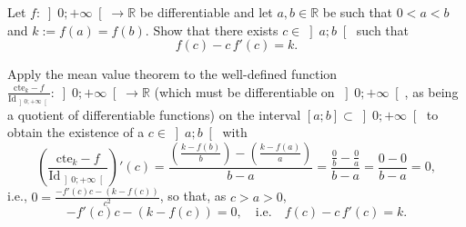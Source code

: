 \begin{problem}
    Let \( f \colon \left]0;+\infty\right[ \longrightarrow \mathbb{R} \) be differentiable and let \( a, b \in \mathbb{R} \) be such that \( 0 < a < b \) and \( k := f\left(a\right) = f\left(b\right) \). Show that there exists \( c \in \left]a;b\right[ \) such that
    \[
        f\left(c\right)-c\,f'\left(c\right) = k.
    \]
\end{problem}
\begin{solution}
    Apply the mean value theorem to the well-defined function \( \frac{\mathrm{cte}_k-f}{\mathrm{Id}_{\left]0;+\infty\right[}} \colon \left]0;+\infty\right[ \longrightarrow \mathbb{R} \) (which must be differentiable on \( \left]0;+\infty\right[ \), as being a quotient of differentiable functions) on the interval \( \left[a;b\right] \subset \left]0;+\infty\right[ \) to obtain the existence of a \( c \in \left]a;b\right[ \) with
    \[
        \left(\frac{\mathrm{cte}_k-f}{\mathrm{Id}_{\left]0;+\infty\right[}}\right)'\left(c\right) = \frac{\left(\frac{k-f\left(b\right)}{b}\right)-\left(\frac{k-f\left(a\right)}{a}\right)}{b-a} = \frac{\frac{0}{b}-\frac{0}{a}}{b-a} = \frac{0-0}{b-a} = 0,
    \]
    i.e., \( 0 = \frac{-f'\left(c\right)c-\left(k-f\left(c\right)\right)}{c^2} \), so that, as \( c > a > 0 \),
    \[
        -f'\left(c\right)c-\left(k-f\left(c\right)\right) = 0, \quad \text{i.e.} \quad f\left(c\right)-c\,f'\left(c\right) = k.
    \]
\end{solution}
